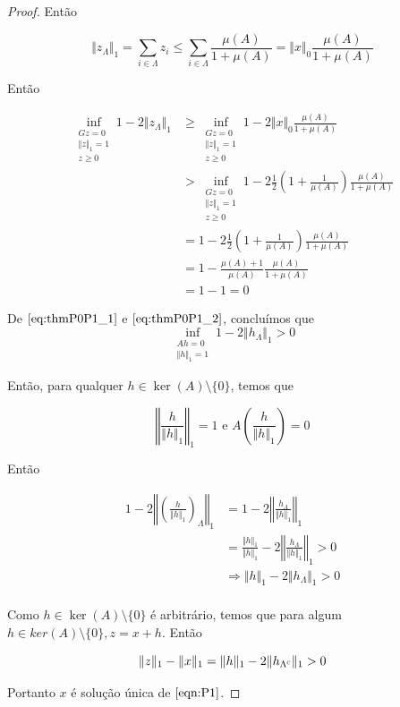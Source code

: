 \begin{proof}
Então

$$ \Vert z_\Lambda \Vert_1
= \sum_{i \in \Lambda} z_i
\leq \sum_{i \in \Lambda} \frac{\mu(A)}{1 + \mu(A)}
= \Vert x \Vert_0 \frac{\mu(A)}{1 + \mu(A)}
$$

Então

\begin{subequations}
\begin{align*}
\inf_{\substack{Gz = 0 \\ \Vert z \Vert_1 = 1 \\ z \geq 0}}
1 - 2 \Vert z_\Lambda \Vert_1
& \geq
\inf_{\substack{Gz = 0 \\ \Vert z \Vert_1 = 1 \\ z \geq 0}}
1 - 2 \Vert x \Vert_0 \frac{\mu(A)}{1 + \mu(A)} \\
& >
\inf_{\substack{Gz = 0 \\ \Vert z \Vert_1 = 1 \\ z \geq 0}}
1 - 2 \frac{1}{2} \left(1 + \frac{1}{\mu(A)}\right) \frac{\mu(A)}{1 + \mu(A)} \\
& = 1 - 2 \frac{1}{2} \left(1 + \frac{1}{\mu(A)}\right) \frac{\mu(A)}{1 + \mu(A)} \\
& = 1 - \frac{\mu(A) + 1}{\mu(A)} \frac{\mu(A)}{1 + \mu(A)}\\
& = 1 - 1 = 0
\end{align*}
\end{subequations}

De $\eqref{eq:thmP0P1_1}$ e $\eqref{eq:thmP0P1_2}$, concluímos que
$$
\inf_{\substack{Ah = 0 \\ \Vert h \Vert_1 = 1}} 1 - 2 \Vert h_\Lambda \Vert_1 > 0$$

Então, para qualquer $h \in \ker(A) \setminus \lbrace 0 \rbrace$, temos que

$$\left\Vert \frac{h}{\Vert h \Vert_1} \right\Vert_1 = 1 \text{ e }
A \left(\frac{h}{\Vert h \Vert_1}\right) = 0$$

Então

\begin{subequations}
\begin{align*}
1 - 2 \left\Vert \left(\frac{h}{\Vert h \Vert_1}\right)_{\Lambda} \right\Vert_1
& = 1 - 2 \left\Vert \frac{h_{\Lambda}}{\Vert h \Vert_1} \right\Vert_1 \\
& = \frac{\Vert h \Vert_1}{\Vert h \Vert_1} - 2 \left\Vert \frac{h_{\Lambda}}{\Vert h \Vert_1} \right\Vert_1 > 0 \\
& \Rightarrow \Vert h \Vert_1 - 2 \Vert h_{\Lambda} \Vert_1 > 0 \\
\end{align*}
\end{subequations}

Como $h \in \ker(A) \setminus \lbrace 0 \rbrace$ é arbitrário, temos que para algum $h \in ker(A) \setminus \lbrace 0 \rbrace, z = x + h$. Então

$$\Vert z \Vert_1 - \Vert x \Vert_1 = \Vert h \Vert_1 - 2\Vert h_{\Lambda^\textsc{c}} \Vert_1 > 0$$

Portanto $x$ é solução única de $\eqref{eqn:P1}$.

\end{proof}

